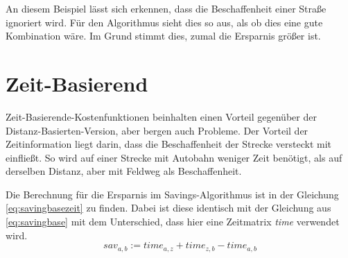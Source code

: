 \noindent
An diesem Beispiel lässt sich erkennen, dass die Beschaffenheit einer Straße ignoriert wird. 
Für den Algorithmus sieht dies so aus, als ob dies eine gute Kombination wäre.
Im Grund stimmt dies, zumal die Ersparnis größer ist. 

\section{Zeit-Basierend}

Zeit-Basierende-Kostenfunktionen beinhalten einen Vorteil gegenüber der Distanz-Basierten-Version, aber bergen auch Probleme. 
Der Vorteil der Zeitinformation liegt darin, dass die Beschaffenheit der Strecke versteckt mit einfließt. 
So wird auf einer Strecke mit Autobahn weniger Zeit benötigt, als auf derselben Distanz, aber mit Feldweg als Beschaffenheit. 

\noindent
Die Berechnung für die Ersparnis im Savings-Algorithmus ist in der Gleichung \ref{eq:savingbasezeit} zu finden. 
Dabei ist diese identisch mit der Gleichung aus \ref{eq:savingbase} mit dem Unterschied, dass hier eine Zeitmatrix \textit{time} verwendet wird. 
\begin{equation}
sav_{a,b} := time_{a,z} + time_{z,b} - time_{a,b}
\label{eq:savingbasezeit}
\end{equation}

